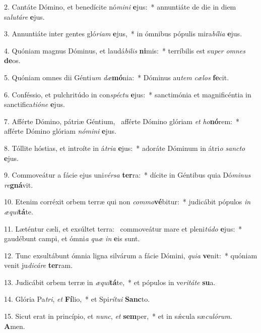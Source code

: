 2. Cantáte Dómino, et benedícite nó\textit{mi}\textit{ni} \textbf{e}jus:~*  annuntiáte de die in diem sa\textit{lu}\textit{tá}\textit{re} \textbf{e}jus.\

3. Annuntiáte inter gentes gló\textit{ri}\textit{am} \textbf{e}jus,~*  in ómnibus pópulis mira\textit{bí}\textit{li}\textit{a} \textbf{e}jus.\

4. Quóniam magnus Dóminus, et laudá\textit{bi}\textit{lis} \textbf{ni}mis:~*  terríbilis est su\textit{per} \textit{om}\textit{nes} \textbf{de}os.\

5. Quóniam omnes dii Génti\textit{um} \textit{dæ}\textbf{mó}nia:~*  Dóminus au\textit{tem} \textit{cæ}\textit{los} \textbf{fe}cit.\

6. Conféssio, et pulchritúdo in con\textit{spéc}\textit{tu} \textbf{e}jus:~*  sanctimónia et magnificéntia in sanctifica\textit{ti}\textit{ó}\textit{ne} \textbf{e}jus.\

7. Afférte Dómino, pátriæ Géntium, \dag\  afférte Dómino glóriam \textit{et} \textit{ho}\textbf{nó}rem:~*  afférte Dómino glóriam \textit{nó}\textit{mi}\textit{ni} \textbf{e}jus.\

8. Tóllite hóstias, et introíte in á\textit{tri}\textit{a} \textbf{e}jus:~*  adoráte Dóminum in átri\textit{o} \textit{sanc}\textit{to} \textbf{e}jus.\

9. Commoveátur a fácie ejus uni\textit{vér}\textit{sa} \textbf{ter}ra:~*  dícite in Géntibus quia Dó\textit{mi}\textit{nus} \textit{re}\textbf{gná}vit.\

10. Etenim corréxit orbem terræ qui non \textit{com}\textit{mo}\textbf{vé}bitur:~*  judicábit pópulos \textit{in} \textit{æ}\textit{qui}\textbf{tá}te.\

11. Læténtur cæli, et exsúltet terra: \dag\  commoveátur mare et pleni\textit{tú}\textit{do} \textbf{e}jus:~*  gaudébunt campi, et ómni\textit{a} \textit{quæ} \textit{in} \textbf{e}is sunt.\

12. Tunc exsultábunt ómnia ligna silvárum a fácie Dómini, \textit{qui}\textit{a} \textbf{ve}nit:~*  quóniam venit ju\textit{di}\textit{cá}\textit{re} \textbf{ter}ram.\

13. Judicábit orbem terræ in \textit{æ}\textit{qui}\textbf{tá}te,~*  et pópulos in ve\textit{ri}\textit{tá}\textit{te} \textbf{su}a.\

14. Glória Pa\textit{tri}, \textit{et} \textbf{Fí}lio,~*  et Spi\textit{rí}\textit{tu}\textit{i} \textbf{Sanc}to.\

15. Sicut erat in princípio, et \textit{nunc}, \textit{et} \textbf{sem}per,~*  et in sǽcula sæ\textit{cu}\textit{ló}\textit{rum}. \textbf{A}men.\

